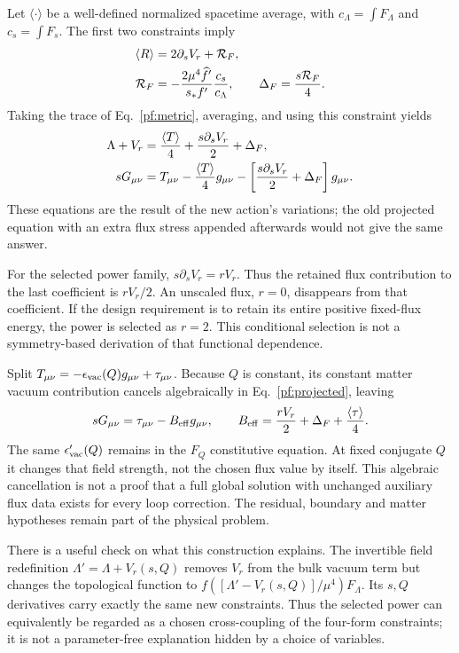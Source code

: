 \documentclass[11pt]{article}
\begin{document}
Let $\langle\cdot\rangle$ be a well-defined normalized spacetime average,
with $c_\Lambda=\int F_\Lambda$ and $c_s=\int F_s$. The first two
constraints imply
\begin{align}
 \langle R\rangle&=2\partial_sV_r+\mathcal R_F,\\
 \mathcal R_F&=-{2\mu^4\widehat f'\over s_*f'}
                                      {c_s\over c_\Lambda},\qquad
 \Delta_F={s\mathcal R_F\over4}.
\end{align}
Taking the trace of Eq.~\eqref{pf:metric}, averaging, and using this
constraint yields
\begin{align}
 \Lambda+V_r&={\langle T\rangle\over4}
                   +{s\partial_sV_r\over2}+\Delta_F,\\
 sG_{\mu\nu}&=T_{\mu\nu}-{\langle T\rangle\over4}g_{\mu\nu}
                -\left[{s\partial_sV_r\over2}+\Delta_F\right]g_{\mu\nu}.
 \label{pf:projected}
\end{align}
These equations are the result of the new action's variations; the old
projected equation with an extra flux stress appended afterwards would
not give the same answer.

For the selected power family, $s\partial_sV_r=rV_r$. Thus the retained
flux contribution to the last coefficient is $rV_r/2$.
An unscaled flux, $r=0$, disappears from that coefficient. If the design
requirement is to retain its entire positive fixed-flux energy, the power
is selected as $r=2$. This conditional selection is not a symmetry-based
derivation of that functional dependence.

Split $T_{\mu\nu}=-\epsilon_{\rm vac}(Q)g_{\mu\nu}
+\tau_{\mu\nu}$. Because $Q$ is constant, its constant matter vacuum
contribution cancels algebraically in Eq.~\eqref{pf:projected}, leaving
\begin{equation}
 sG_{\mu\nu}=\tau_{\mu\nu}-B_{\rm eff}g_{\mu\nu},\qquad
 B_{\rm eff}={rV_r\over2}+\Delta_F+{\langle\tau\rangle\over4}.
 \label{pf:Beff}
\end{equation}
The same $\epsilon_{\rm vac}'(Q)$ remains in the $F_Q$ constitutive
equation. At fixed conjugate $Q$ it changes that field strength, not the
chosen flux value by itself. This algebraic cancellation is not a proof
that a full global solution with unchanged auxiliary flux data exists
for every loop correction. The residual, boundary and matter hypotheses
remain part of the physical problem.

There is a useful check on what this construction explains. The invertible
field redefinition $\Lambda'=\Lambda+V_r(s,Q)$ removes $V_r$ from the
bulk vacuum term but changes the topological function to
$f([\Lambda'-V_r(s,Q)]/\mu^4)F_\Lambda$. Its $s,Q$ derivatives carry
exactly the same new constraints. Thus the selected power can equivalently
be regarded as a chosen cross-coupling of the four-form constraints; it
is not a parameter-free explanation hidden by a choice of variables.
\end{document}
